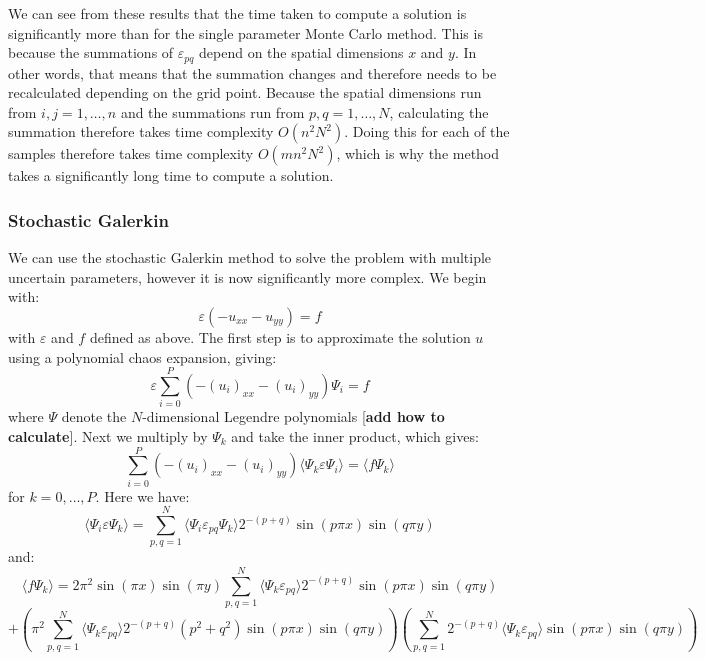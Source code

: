 \documentclass[11pt]{article}
\numberwithin{equation}{section}
\begin{document}
We can see from these results that the time taken to compute a solution is significantly more than for the single parameter Monte Carlo method. This is because the summations of $\varepsilon_{pq}$ depend on the spatial dimensions $x$ and $y$. In other words, that means that the summation changes and therefore needs to be recalculated depending on the grid point. Because the spatial dimensions run from $i,j=1,\dots,n$ and the summations run from $p,q=1,\dots,N$, calculating the summation therefore takes time complexity $O(n^2 N^2)$. Doing this for each of the samples therefore takes time complexity $O(m n^2 N^2)$, which is why the method takes a significantly long time to compute a solution.

\subsubsection{Stochastic Galerkin}
We can use the stochastic Galerkin method to solve the problem with multiple uncertain parameters, however it is now significantly more complex. We begin with:
\begin{equation}
\varepsilon(-u_{xx} - u_{yy}) = f
\end{equation}
with $\varepsilon$ and $f$ defined as above. The first step is to approximate the solution $u$ using a polynomial chaos expansion, giving:
\begin{equation}
\varepsilon \sum_{i=0}^P (-(u_i)_{xx} - (u_i)_{yy}) \Psi_i = f
\end{equation}
where $\Psi$ denote the $N$-dimensional Legendre polynomials [\textbf{add how to calculate}]. Next we multiply by $\Psi_k$ and take the inner product, which gives:
\begin{equation}
\sum_{i=0}^P (-(u_i)_{xx} - (u_i)_{yy}) \langle \Psi_k \varepsilon \Psi_i \rangle = \langle f \Psi_k \rangle
\end{equation}
for $k=0,\dots,P$. Here we have:
\begin{equation}
\langle \Psi_i \varepsilon \Psi_k \rangle = \sum_{p,q=1}^N \langle \Psi_i \varepsilon_{pq} \Psi_k \rangle 2^{-(p+q)} \sin(p\pi x)\sin(q\pi y) 
\end{equation}
and:
\begin{equation}
\langle f \Psi_k \rangle = 2 \pi^2 \sin(\pi x)\sin(\pi y) \sum_{p,q=1}^N \langle \Psi_k \varepsilon_{pq} \rangle 2^{-(p+q)} \sin(p \pi x) \sin(q \pi y)  \nonumber
\end{equation}
\begin{equation}
+ \left(\pi^2 \sum_{p,q=1}^N \langle \Psi_k \varepsilon_{pq} \rangle 2^{-(p+q)} (p^2 + q^2) \sin(p \pi x)\sin(q \pi y) \right) \left(\sum_{p,q=1}^N 2^{-(p+q)} \langle \Psi_k \varepsilon_{pq} \rangle \sin(p \pi x)\sin(q \pi y) \right)
\end{equation}
\end{document}
